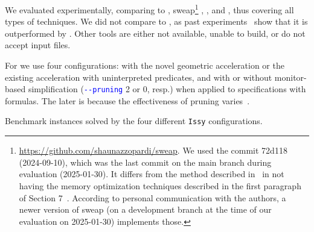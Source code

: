 

\begin{figure}[t!]
\begin{minipage}[t]{0.44\textwidth}
\centering
\macrorpgplot
\vspace{-.2cm}

\label{figure:rpg-compare}
\end{minipage}
\hspace{0.05\textwidth}
\begin{minipage}[t]{0.47\textwidth}
\centering
\macrotslmtplot
\vspace{-.2cm}

\label{figure:tslmt-compare}
\end{minipage}
\end{figure}

We evaluated \issy{} experimentally, comparing to \raboniel{}, sweap\footnote{%
\url{https://github.com/shaunazzopardi/sweap}. %
We used the commit 72d118 (2024-09-10), which was the last commit on the main branch during evaluation (2025-01-30). %
It differs from the method described in~\cite{AzzopardiPSS24} in not having the memory optimization techniques described in the first paragraph of Section 7~\cite{AzzopardiPSS24}. According to personal communication with the authors, a newer version of sweap (on a development branch at the time of our evaluation on 2025-01-30) implements those.}
, \muval{},  \rpgsolve{} and \tslmtrpg{},  thus covering all types of techniques. 
We did not compare to \temos{}, as past experiments~\cite{HeimD24,HeimD25} show that it is outperformed by \raboniel{}.
Other tools are either not available, unable to build, or do not accept input files.

For \issy{} we use four configurations: with the novel geometric acceleration or the existing acceleration with uninterpreted predicates,  and with or without monitor-based simplification (\texttt{\textcolor{blue}{-{}-pruning}} 2 or 0, resp.) when applied to specifications with formulas.
The later is because the effectiveness of pruning varies~\cite{HeimD25}.


\begin{wraptable}{r}{0.5\textwidth}
\vspace{-7mm}
\caption{Benchmark instances solved by the four different \texttt{Issy} configurations.}\label{table:summary-data}
\vspace{-2mm}
\macrosummarytable
\vspace{-7mm}
\end{wraptable}

